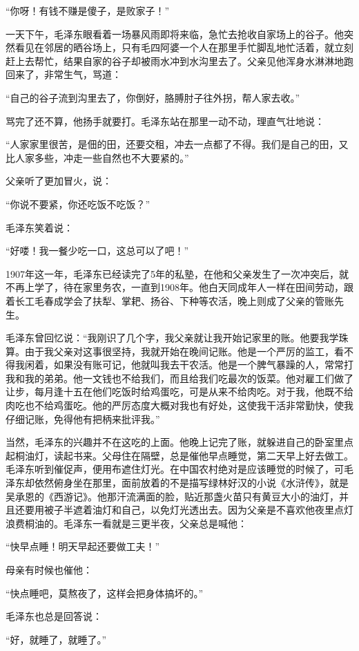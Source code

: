 \documentclass[../../dazhuan.tex]{subfiles}
\begin{document}
“你呀！有钱不赚是傻子，是败家子！”

一天下午，毛泽东眼看着一场暴风雨即将来临，急忙去抢收自家场上的谷子。他突然看见在邻居的晒谷场上，只有毛四阿婆一个人在那里手忙脚乱地忙活着，就立刻赶上去帮忙，结果自家的谷子却被雨水冲到水沟里去了。父亲见他浑身水淋淋地跑回来了，非常生气，骂道：

“自己的谷子流到沟里去了，你倒好，胳膊肘子往外拐，帮人家去收。”

骂完了还不算，他扬手就要打。毛泽东站在那里一动不动，理直气壮地说：

“人家家里很苦，是佃的田，还要交租，冲去一点都了不得。我们是自己的田，又比人家多些，冲走一些自然也不大要紧的。”

父亲听了更加冒火，说：

“你说不要紧，你还吃饭不吃饭？”

毛泽东笑着说：

“好喽！我一餐少吃一口，这总可以了吧！”

1907年这一年，毛泽东已经读完了5年的私塾，在他和父亲发生了一次冲突后，就不再上学了，待在家里务农，一直到1908年。他白天同成年人一样在田间劳动，跟着长工毛春成学会了扶犁、掌耙、扬谷、下种等农活，晚上则成了父亲的管账先生。

毛泽东曾回忆说：“我刚识了几个字，我父亲就让我开始记家里的账。他要我学珠算。由于我父亲对这事很坚持，我就开始在晚间记账。他是一个严厉的监工，看不得我闲着，如果没有账可记，他就叫我去干农活。他是一个脾气暴躁的人，常常打我和我的弟弟。他一文钱也不给我们，而且给我们吃最次的饭菜。他对雇工们做了让步，每月逢十五在他们吃饭时给鸡蛋吃，可是从来不给肉吃。对于我，他既不给肉吃也不给鸡蛋吃。他的严厉态度大概对我也有好处，这使我干活非常勤快，使我仔细记账，免得他有把柄来批评我。”

当然，毛泽东的兴趣并不在这吃的上面。他晚上记完了账，就躲进自己的卧室里点起桐油灯，读起书来。父母住在隔壁，总是催他早点睡觉，第二天早上好去做工。毛泽东听到催促声，便用布遮住灯光。在中国农村绝对是应该睡觉的时候了，可毛泽东却依然俯身坐在那里，面前放着的不是描写绿林好汉的小说《水浒传》，就是吴承恩的《西游记》。他那汗流满面的脸，贴近那盏火苗只有黄豆大小的油灯，并且还要用被子半遮着油灯和自己，以免灯光透出去。因为父亲是不喜欢他夜里点灯浪费桐油的。毛泽东一看就是三更半夜，父亲总是喊他：

“快早点睡！明天早起还要做工夫！”

母亲有时候也催他：

“快点睡吧，莫熬夜了，这样会把身体搞坏的。”

毛泽东也总是回答说：

“好，就睡了，就睡了。”
\end{document}
